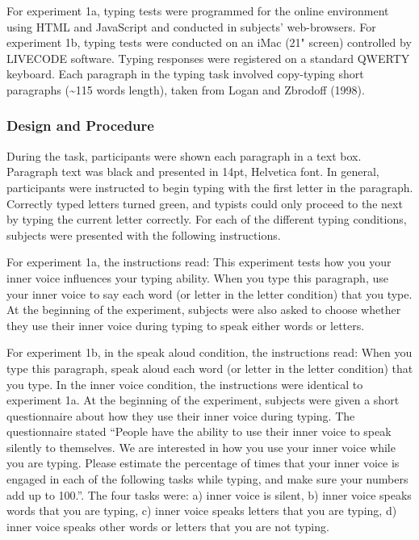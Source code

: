 \documentclass[,man,floatsintext]{apa6}
\begin{document}
For experiment 1a, typing tests were programmed for the online environment using HTML and JavaScript and conducted in subjects' web-browsers. For experiment 1b, typing tests were conducted on an iMac (21" screen) controlled by LIVECODE software. Typing responses were registered on a standard QWERTY keyboard. Each paragraph in the typing task involved copy-typing short paragraphs (\textasciitilde{}115 words length), taken from Logan and Zbrodoff (1998).

\hypertarget{design-and-procedure}{%
\subsubsection{Design and Procedure}\label{design-and-procedure}}

During the task, participants were shown each paragraph in a text box. Paragraph text was black and presented in 14pt, Helvetica font. In general, participants were instructed to begin typing with the first letter in the paragraph. Correctly typed letters turned green, and typists could only proceed to the next by typing the current letter correctly. For each of the different typing conditions, subjects were presented with the following instructions.

For experiment 1a, the instructions read: This experiment tests how you your inner voice influences your typing ability. When you type this paragraph, use your inner voice to say each word (or letter in the letter condition) that you type. At the beginning of the experiment, subjects were also asked to choose whether they use their inner voice during typing to speak either words or letters.

For experiment 1b, in the speak aloud condition, the instructions read: When you type this paragraph, speak aloud each word (or letter in the letter condition) that you type. In the inner voice condition, the instructions were identical to experiment 1a. At the beginning of the experiment, subjects were given a short questionnaire about how they use their inner voice during typing. The questionnaire stated \enquote{People have the ability to use their inner voice to speak silently to themselves. We are interested in how you use your inner voice while you are typing. Please estimate the percentage of times that your inner voice is engaged in each of the following tasks while typing, and make sure your numbers add up to 100.}. The four tasks were: a) inner voice is silent, b) inner voice speaks words that you are typing, c) inner voice speaks letters that you are typing, d) inner voice speaks other words or letters that you are not typing.
\end{document}
